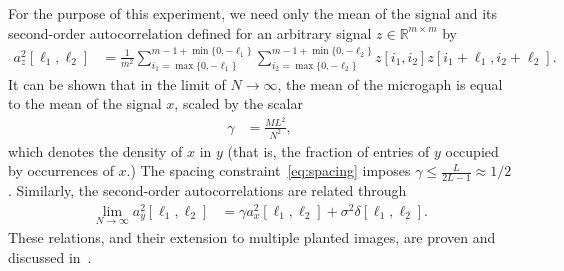 \documentclass[english,11pt]{article}
\newcommand{\1}{\mathbf{1}}
\newcommand{\TODO}[1]{{\color{red}{[#1]}}}
\numberwithin{equation}{section}
\theoremstyle{plain}
\theoremstyle{definition}
\theoremstyle{remark}
\theoremstyle{plain}
\theoremstyle{remark}
\theoremstyle{plain}
\theoremstyle{plain}
\begin{document}
%
For the purpose of this experiment, we need only the mean of the signal and its second-order autocorrelation defined for an arbitrary signal $z\in\mathbb{R}^{m\times m}$ by \TODO{to verify}
 \begin{align} 
 a_z^2[\ell_1,\ell_2] & = \frac{1}{m^2} \sum_{i_1 = \max\{0, -\ell_1\}}^{m-1 + \min\{0, -\ell_1\}} \sum_{i_2 = \max\{0, -\ell_2\}}^{m-1 + \min\{0, -\ell_2\}}z[i_1,i_2]z[i_1+\ell_1,i_2+\ell_2]. 
 \end{align}
 It can be shown that in the limit of $N\to\infty$,  the mean of the microgaph is equal to the mean of the signal $x$, scaled by the scalar 
 \begin{align}
 \gamma & = \frac{M L^2}{N^2},
 \end{align}
 which denotes the density of $x$ in $y$ (that is, the fraction of entries of $y$ occupied by occurrences of $x$.) The spacing constraint~\eqref{eq:spacing} imposes $\gamma\leq\frac{L}{2L-1}\approx 1/2$.
 Similarly, the second-order autocorrelations are related through 
 \begin{align*}
	\lim_{N\to\infty} a_y^2[\ell_1,\ell_2] & = \gamma a_{x}^2[\ell_1,\ell_2] + \sigma^2\delta[\ell_1,\ell_2].
 \end{align*}
 These relations, and their extension to multiple planted images, are proven and discussed in~\cite{bendory2018estimation}. 
 
\end{document}
